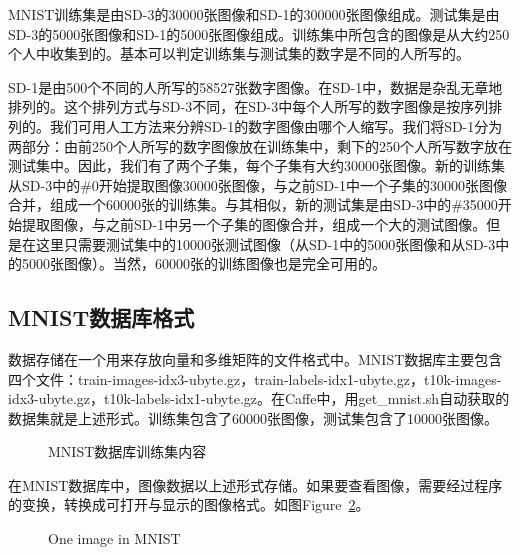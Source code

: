 MNIST训练集是由SD-3的30000张图像和SD-1的300000张图像组成。测试集是由SD-3的5000张图像和SD-1的5000张图像组成。训练集中所包含的图像是从大约250个人中收集到的。基本可以判定训练集与测试集的数字是不同的人所写的。

SD-1是由500个不同的人所写的58527张数字图像。在SD-1中，数据是杂乱无章地排列的。这个排列方式与SD-3不同，在SD-3中每个人所写的数字图像是按序列排列的。我们可用人工方法来分辨SD-1的数字图像由哪个人缩写。我们将SD-1分为两部分：由前250个人所写的数字图像放在训练集中，剩下的250个人所写数字放在测试集中。因此，我们有了两个子集，每个子集有大约30000张图像。新的训练集从SD-3中的\#0开始提取图像30000张图像，与之前SD-1中一个子集的30000张图像合并，组成一个60000张的训练集。与其相似，新的测试集是由SD-3中的\#35000开始提取图像，与之前SD-1中另一个子集的图像合并，组成一个大的测试图像。但是在这里只需要测试集中的10000张测试图像（从SD-1中的5000张图像和从SD-3中的5000张图像）。当然，60000张的训练图像也是完全可用的。


\subsection{MNIST数据库格式}

数据存储在一个用来存放向量和多维矩阵的文件格式中。MNIST数据库主要包含四个文件：{\footnotesize{train-images-idx3-ubyte.gz}}，{\footnotesize{train-labels-idx1-ubyte.gz}}，{\footnotesize{t10k-images-idx3-ubyte.gz}}，{\footnotesize{t10k-labels-idx1-ubyte.gz}}。在Caffe中，用{\footnotesize{get\_mnist.sh}}自动获取的数据集就是上述形式。训练集包含了60000张图像，测试集包含了10000张图像。

\begin{figure}[!ht]
  \centering 
  \caption{MNIST数据库训练集内容}
  \label{fig: } %
\end{figure}

在MNIST数据库中，图像数据以上述形式存储。如果要查看图像，需要经过程序的变换，转换成可打开与显示的图像格式。如图Figure~\ref{fig:mnist}。
\begin{figure}[!ht]
  \centering 
  \caption{One image in MNIST}
  \label{fig:mnist} %
\end{figure}

